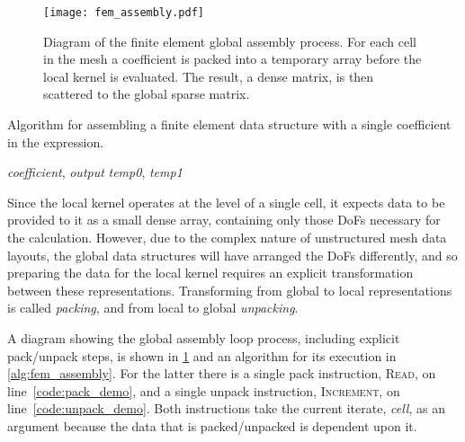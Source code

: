 \documentclass[thesis]{subfiles}
\begin{document}
\begin{figure}
  \centering
  \texttt{[image: fem\_assembly.pdf]}
  \caption{
    Diagram of the finite element global assembly process.
    For each cell in the mesh a coefficient is packed into a temporary array before the local kernel is evaluated.
    The result, a dense matrix, is then scattered to the global sparse matrix.
  }
  \label{fig:fem_assembly}
\end{figure}

\begin{algorithm}
  \caption{
    Algorithm for assembling a finite element data structure with a single coefficient in the expression.
  }
  \begin{algorithmic}[1]
    \Require \textit{coefficient}, \textit{output} 
    \Require \textit{temp0}, \textit{temp1} 

      \State {} \label{code:pack_demo}
      \State {} 
      \State {} 
      \State {} \label{code:unpack_demo}
    \EndFor
  \end{algorithmic}
  \label{alg:fem_assembly}
\end{algorithm}

Since the local kernel operates at the level of a single cell, it expects data to be provided to it as a small dense array, containing only those DoFs necessary for the calculation.
However, due to the complex nature of unstructured mesh data layouts, the global data structures will have arranged the DoFs differently, and so preparing the data for the local kernel requires an explicit transformation between these representations.
Transforming from global to local representations is called \emph{packing}, and from local to global \emph{unpacking}.

A diagram showing the global assembly loop process, including explicit pack/unpack steps, is shown in \cref{fig:fem_assembly} and an algorithm for its execution in \cref{alg:fem_assembly}.
For the latter there is a single pack instruction, \textsc{Read}, on line~\ref{code:pack_demo}, and a single unpack instruction, \textsc{Increment}, on line~\ref{code:unpack_demo}.
Both instructions take the current iterate, \textit{cell}, as an argument because the data that is packed/unpacked is dependent upon it.
\end{document}
